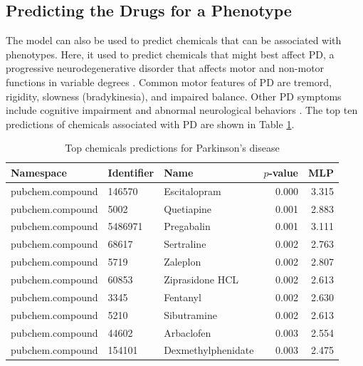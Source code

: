 \subsection{Predicting the Drugs for a Phenotype}
The model can also be used to predict chemicals that can be associated with phenotypes.
Here, it used to predict chemicals that might best affect \ac{PD}, a progressive neurodegenerative disorder that affects motor and non-motor functions in variable degrees \cite{jankovic_parkinsons_2008}.
Common motor features of \ac{PD} are tremord, rigidity, slowness (bradykinesia), and impaired balance.
Other \ac{PD} symptoms include cognitive impairment and abnormal neurological behaviors \cite{jankovic_parkinsons_2008}.
The top ten predictions of chemicals associated with \ac{PD} are shown in Table \ref{tab:phenotype_drug}.

\begin{table}[h]
    \centering
    \begin{tabular}{|l|l|l|r|r|} 
        \hline
        \textbf{Namespace} & \textbf{Identifier} & \textbf{Name} & \textbf{$p$-value} & \textbf{MLP} \\
        \hline
        pubchem.compound &  146570 &  Escitalopram &  0.000 &  3.315 \\
        \hline
        pubchem.compound & 5002 &  Quetiapine &  0.001 &  2.883 \\
        \hline
        pubchem.compound &  5486971 &  Pregabalin &  0.001 &  3.111 \\
        \hline
        pubchem.compound & 68617 &  Sertraline &  0.002 &  2.763 \\
        \hline
        pubchem.compound &  5719 &  Zaleplon &  0.002 &  2.807 \\
        \hline
        pubchem.compound & 60853 & Ziprasidone HCL &  0.002 &  2.613 \\
        \hline
        pubchem.compound & 3345 & Fentanyl &  0.002 &  2.630 \\
        \hline
        pubchem.compound & 5210 & Sibutramine &  0.002 &  2.613 \\
        \hline
        pubchem.compound & 44602 &  Arbaclofen &  0.003 &  2.554 \\
        \hline
        pubchem.compound & 154101 & Dexmethylphenidate &  0.003 &  2.475 \\
        \hline
    \end{tabular}
    \caption{Top chemicals predictions for Parkinson's disease}
    \label{tab:phenotype_drug}
\end{table}

